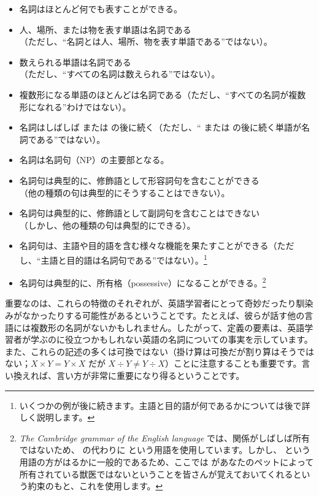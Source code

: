 \begin{itemize}[noitemsep]
    \item 名詞はほとんど何でも表すことができる。
    \item 人、場所、または物を表す単語は名詞である\\（ただし、\enquote{名詞とは人、場所、物を表す単語である}ではない）。
    \item 数えられる単語は名詞である\\（ただし、\enquote{すべての名詞は数えられる}ではない）。
    \item 複数形になる単語のほとんどは名詞である（ただし、\enquote{すべての名詞が複数形になれる}わけではない）。
    \item 名詞はしばしば  または  の後に続く（ただし、\enquote{ または  の後に続く単語が名詞である}ではない）。
    \item 名詞は名詞句（NP）の主要部となる。
    \item 名詞句は典型的に、修飾語として形容詞句を含むことができる\\（他の種類の句は典型的にそうすることはできない）。
    \item 名詞句は典型的に、修飾語として副詞句を含むことはできない\\（しかし、他の種類の句は典型的にできる）。
    \item {}名詞句は、主語や目的語を含む様々な機能を果たすことができる（ただし、\enquote{主語と目的語は名詞句である}ではない）。\footnote{いくつかの例が後に続きます。主語と目的語が何であるかについては後で詳しく説明します。}
    \item {}名詞句は典型的に、所有格（possessive）になることができる。\footnote{\textit{The Cambridge grammar of the English language} では、関係がしばしば所有ではないため、 の代わりに  という用語を使用しています。しかし、 という用語の方がはるかに一般的であるため、ここでは  があなたのペットによって所有されている獣医ではないということを皆さんが覚えておいてくれるという約束のもと、これを使用します。}
\end{itemize}

重要なのは、これらの特徴のそれぞれが、英語学習者にとって奇妙だったり馴染みがなかったりする可能性があるということです。たとえば、彼らが話す他の言語には複数形の名詞がないかもしれません。したがって、定義の要素は、英語学習者が学ぶのに役立つかもしれない英語の名詞についての事実を示しています。また、これらの記述の多くは可換ではない（掛け算は可換だが割り算はそうではない；$X \times Y = Y \times X$ だが $X \div Y \neq Y \div X$）ことに注意することも重要です。言い換えれば、言い方が非常に重要になり得るということです。

